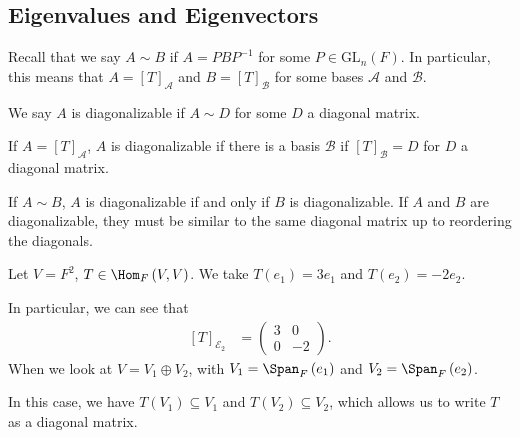 \documentclass[10pt]{mypackage}
\begin{document}
\subsection{Eigenvalues and Eigenvectors}%
Recall that we say $A \sim B$ if $A = PBP^{-1}$ for some $P\in \text{GL}_{n}\left(F\right)$. In particular, this means that $A = \left[T\right]_{\mathcal{A}}$ and $B = \left[T\right]_{\mathcal{B}}$ for some bases $\mathcal{A}$ and $\mathcal{B}$.
\begin{definition}[Diagonalizable]
  We say $A$ is diagonalizable if $A \sim D$ for some $D$ a diagonal matrix.\newline

  If $A = \left[T\right]_{\mathcal{A}}$, $A$ is diagonalizable if there is a basis $\mathcal{B}$ if $\left[T\right]_{\mathcal{B}} = D$ for $D$ a diagonal matrix.\newline

  If $A\sim B$, $A$ is diagonalizable if and only if $B$ is diagonalizable. If $A$ and $B$ are diagonalizable, they must be similar to the same diagonal matrix up to reordering the diagonals.
\end{definition}
\begin{example}
  Let $V = F^2$, $T \in \Hom_{F}\left(V,V\right)$. We take $T\left(e_1\right) = 3e_1$ and $T\left(e_2\right) = -2e_2$.\newline

  In particular, we can see that
  \begin{align*}
    \left[T\right]_{\mathcal{E}_2} &= \begin{pmatrix}3 & 0 \\ 0 & -2\end{pmatrix}.
  \end{align*}
  When we look at $V = V_1\oplus V_2$, with $V_1 = \Span_{F}\left(e_1\right)$ and $V_2 = \Span_{F}\left(e_2\right)$.\newline

  In this case, we have $T\left(V_1\right)\subseteq V_1$ and $T\left(V_2\right) \subseteq V_2$, which allows us to write $T$ as a diagonal matrix.
\end{example}
\end{document}
